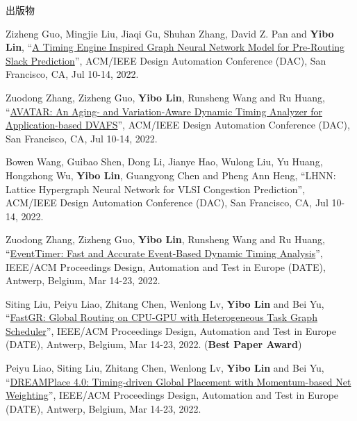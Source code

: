\begin{rSection}{出版物}
\begin{description}[font=\normalfont, rightmargin=2em]
{}
            

\item[{[C63]}]{
        Zizheng Guo, Mingjie Liu, Jiaqi Gu, Shuhan Zhang, David Z. Pan and \textbf{Yibo Lin}, 
    ``\href{https://doi.org/10.1145/3489517.3530597}{A Timing Engine Inspired Graph Neural Network Model for Pre-Routing Slack Prediction}'', 
    ACM/IEEE Design Automation Conference (DAC), San Francisco, CA, Jul 10-14, 2022.
    
}
            

\item[{[C62]}]{
        Zuodong Zhang, Zizheng Guo, \textbf{Yibo Lin}, Runsheng Wang and Ru Huang, 
    ``\href{https://doi.org/10.1145/3489517.3530530}{AVATAR: An Aging- and Variation-Aware Dynamic Timing Analyzer for Application-based DVAFS}'', 
    ACM/IEEE Design Automation Conference (DAC), San Francisco, CA, Jul 10-14, 2022.
    
}
            

\item[{[C61]}]{
        Bowen Wang, Guibao Shen, Dong Li, Jianye Hao, Wulong Liu, Yu Huang, Hongzhong Wu, \textbf{Yibo Lin}, Guangyong Chen and Pheng Ann Heng, 
    ``LHNN: Lattice Hypergraph Neural Network for VLSI Congestion Prediction'', 
    ACM/IEEE Design Automation Conference (DAC), San Francisco, CA, Jul 10-14, 2022.
    
}
            

\item[{[C60]}]{
        Zuodong Zhang, Zizheng Guo, \textbf{Yibo Lin}, Runsheng Wang and Ru Huang, 
    ``\href{https://doi.org/10.23919/DATE54114.2022.9774642}{EventTimer: Fast and Accurate Event-Based Dynamic Timing Analysis}'', 
    IEEE/ACM Proceedings Design, Automation and Test in Europe (DATE), Antwerp, Belgium, Mar 14-23, 2022.
    
}
            

\item[{[C59]}]{
        Siting Liu, Peiyu Liao, Zhitang Chen, Wenlong Lv, \textbf{Yibo Lin} and Bei Yu, 
    ``\href{https://doi.org/10.23919/DATE54114.2022.9774606}{FastGR: Global Routing on CPU-GPU with Heterogeneous Task Graph Scheduler}'', 
    IEEE/ACM Proceedings Design, Automation and Test in Europe (DATE), Antwerp, Belgium, Mar 14-23, 2022.
    (\textbf{Best Paper Award})
}
            

\item[{[C58]}]{
        Peiyu Liao, Siting Liu, Zhitang Chen, Wenlong Lv, \textbf{Yibo Lin} and Bei Yu, 
    ``\href{https://doi.org/10.23919/DATE54114.2022.9774725}{DREAMPlace 4.0: Timing-driven Global Placement with Momentum-based Net Weighting}'', 
    IEEE/ACM Proceedings Design, Automation and Test in Europe (DATE), Antwerp, Belgium, Mar 14-23, 2022.
    
}
\end{description}
\end{rSection}

